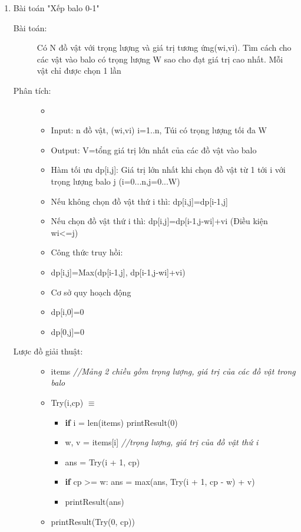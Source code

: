 \begin{enumerate}
    \item Bài toán "Xếp balo 0-1"
    \begin{description}
        \item[Bài toán:]Có N đồ vật với trọng lượng và giá trị tương ứng(wi,vi). Tìm cách cho các vật vào balo có trọng lượng W sao cho đạt giá trị cao
        nhất. Mỗi vật chỉ được chọn 1 lần
        \item[Phân tích:]
            \begin{itemize}
                \item[]
                \item Input: n đồ vật, (wi,vi) i=1..n, Túi có trọng lượng tối đa W
                \item Output: V=tổng giá trị lớn nhất của các đồ vật vào balo
                \item Hàm tối ưu dp[i,j]: Giá trị lớn nhất khi chọn đồ vật từ 1 tới i với trọng lượng balo j (i=0...n,j=0...W)
                \item[]Nếu không chọn đồ vật thứ i thì: dp[i,j]=dp[i-1,j]
                \item[]Nếu chọn đồ vật thứ i thì: dp[i,j]=dp[i-1,j-wi]+vi (Điều kiện wi<=j)
                \item Công thức truy hồi: 
                \item[]dp[i,j]=Max(dp[i-1,j], dp[i-1,j-wi]+vi)
                \item Cơ sở quy hoạch động
                \item[]dp[i,0]=0
                \item[]dp[0,j]=0
            \end{itemize}
            \item[Lược đồ giải thuật:]
            \item[] 
            \begin{itemize}
                \item [] items \textit{//Mảng 2 chiều gồm trọng lượng, giá trị của các đồ vật trong balo}
                \item [] Try(i,cp) $\equiv$
                    \begin{itemize}
                        \item [] \textbf{if} i = len(items) printResult(0)
                        \item []w, v = items[i] \textit{//trọng lượng, giá trị của đồ vật thứ i}
                        \item []ans = Try(i + 1, cp)
                        \item []\textbf{if} cp >= w: ans = max(ans, Try(i + 1, cp - w) + v)
                        \item []printResult(ans)
                    \end{itemize}
                \item [] printResult(Try(0, cp))
            \end{itemize}
    \end{description}
\end{enumerate}  